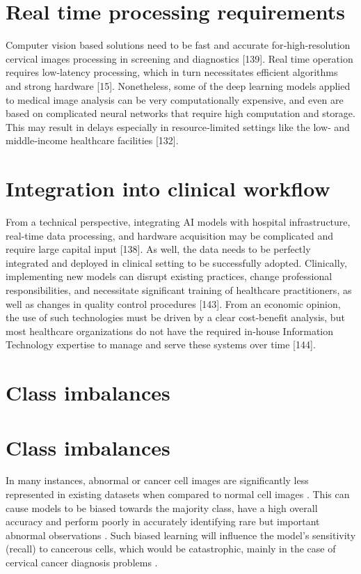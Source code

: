 \documentclass[final,5p,times,twocolumn,authoryear]{elsarticle}
\begin{document}
\section{Real time processing requirements}
Computer vision based solutions need to be fast and accurate for‑high‑resolution cervical images processing in screening and diagnostics [139]. Real time operation requires low‑latency processing, which in turn necessitates efficient algorithms and strong hardware [15]. Nonetheless, some of the deep learning models applied to medical image analysis can be very computationally expensive, and even are based on complicated neural networks that require high computation and storage. This may result in delays especially in resource‑limited settings like the low‑ and middle‑income healthcare facilities [132].
\section{Integration into clinical workflow}
From a technical perspective, integrating AI models with hospital infrastructure, real‑time data processing, and hardware acquisition may be complicated and require large capital input [138]. As well, the data needs to be perfectly integrated and deployed in clinical setting to be successfully adopted. Clinically, implementing new models can disrupt existing practices, change professional responsibilities, and necessitate significant training of healthcare practitioners, as well as changes in quality control procedures [143]. From an economic opinion, the use of such technologies must be driven by a clear cost‑benefit analysis, but most healthcare organizations do not have the required in‑house Information Technology expertise to manage and serve these systems over time [144].
\section{Class imbalances}

\section{Class imbalances}
In many instances, abnormal or cancer cell images are significantly less represented in existing datasets when compared to normal cell images \cite{ref145}. This can cause models to be biased towards the majority class, have a high overall accuracy and perform poorly in accurately identifying rare but important abnormal observations \cite{ref146,ref147}. Such biased learning will influence the model’s sensitivity (recall) to cancerous cells, which would be catastrophic, mainly in the case of cervical cancer diagnosis problems \cite{ref148,ref149}.
\end{document}
